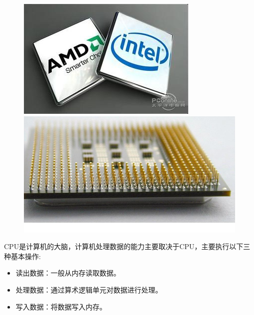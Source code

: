 \begin{frame}[fragile]
\begin{figure}[h] 
\begin{minipage}[t]{0.45\linewidth}
\centering
\includegraphics[width=\textwidth]{slide01/images/cpu1}
\end{minipage}
\hfill
\begin{minipage}[t]{0.45\linewidth}
\centering
\includegraphics[width=\textwidth]{slide01/images/cpu2}
\end{minipage}
\end{figure}
\end{frame}

\begin{frame}
CPU是计算机的大脑，计算机处理数据的能力主要取决于CPU，主要执行以下三种基本操作: 

\begin{itemize}
\item 读出数据：一般从内存读取数据。 \\[0.1in]
\item 处理数据：通过算术逻辑单元对数据进行处理。 \\[0.1in]
\item 写入数据：将数据写入内存。
\end{itemize}

\end{frame}

